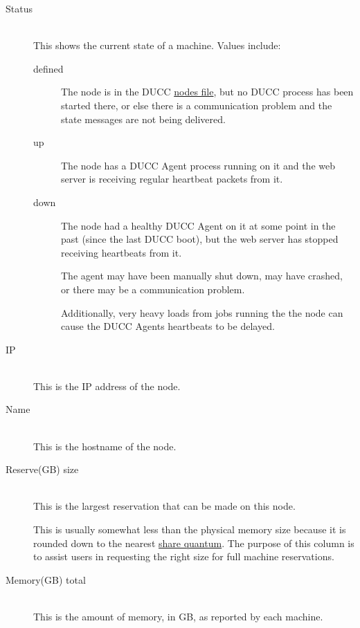    \begin{description}
      \item[Status] \hfill \\
        This shows the current state of a machine.  Values include:
        \begin{description}
          \item[defined] The node is in the DUCC
            \hyperref[sec:admin-ducc.nodes]{nodes file}, but no DUCC process has been
            started there, or else there is a communication problem and
            the state messages are not being delivered.
            \item[up] The node has a DUCC Agent process running on it and the
              web server is receiving regular heartbeat packets from it.
            \item[down] The node had a healthy DUCC Agent on it at some point
              in the past (since the last DUCC boot), but the web server has stopped
              receiving heartbeats from it. 

              The agent may have been manually shut down, may have crashed, or there
              may be a communication problem.

              Additionally, very heavy loads from jobs running the the node can cause
              the DUCC Agents heartbeats to be delayed.
        \end{description}


      \item[IP] \hfill \\
        This is the IP address of the node.

      \item[Name] \hfill \\
        This is the hostname of the node.

      \item[Reserve(GB) size] \hfill \\
        This is the largest reservation that can be made on this node.

        This is usually somewhat less than the physical memory size because it is 
        rounded down to the nearest \hyperref[chap:rm]{share quantum}.  The purpose of this
        column is to assist users in requesting the right size for full machine 
        reservations.

      \item[Memory(GB) total] \hfill \\
        This is the amount of memory, in GB, as reported by each machine.
        

\end{description}
